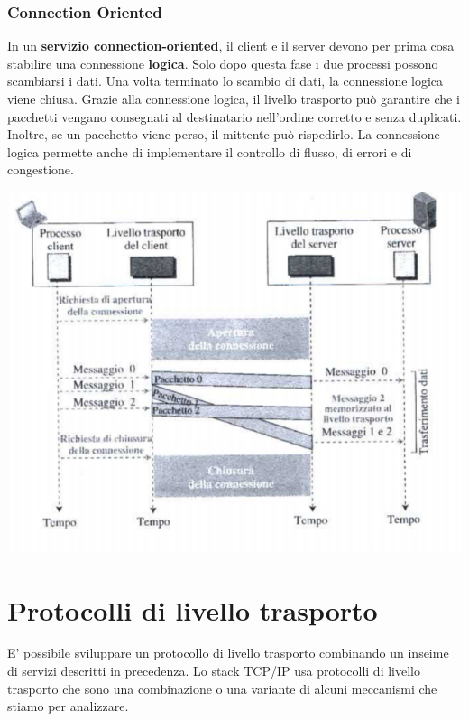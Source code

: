 \documentclass[12pt]{report}
\begin{document}
	\subsubsection{Connection Oriented}
	In un \textbf{servizio connection-oriented}, il client e il server devono per prima cosa stabilire una connessione \textbf{logica}. Solo dopo questa fase i due processi possono scambiarsi i dati. Una volta terminato lo scambio di dati, la connessione logica viene chiusa. Grazie alla connessione logica, il livello trasporto può garantire che i pacchetti vengano consegnati al destinatario nell'ordine corretto e senza duplicati. Inoltre, se un pacchetto viene perso, il mittente può rispedirlo. La connessione logica permette anche di implementare il controllo di flusso, di errori e di congestione.
	\begin{center}
		\includegraphics[scale=0.5]{assets/conn-orie.png}
	\end{center}

	\section{Protocolli di livello trasporto}
	E' possibile sviluppare un protocollo di livello trasporto combinando un inseime di servizi descritti in precedenza. Lo stack TCP/IP usa protocolli di livello trasporto che sono una combinazione o una variante di alcuni meccanismi che stiamo per analizzare.
\end{document}
